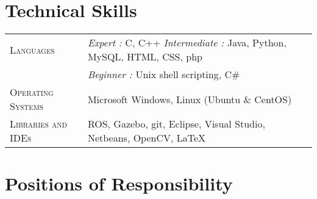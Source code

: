 \documentclass[a4paper,10pt]{extarticle} %
\begin{document}
\section{Technical Skills}

\begin{tabular}{R{3.0cm}|p{15.0cm}}
\textsc{Languages} & {\itshape{Expert : }}C, C++ {\itshape{Intermediate : }}Java, Python, MySQL, HTML, CSS, php\\
& {\itshape{Beginner : }}Unix shell scripting, C\# \\
\textsc{Operating Systems} &  Microsoft Windows, Linux (Ubuntu \& CentOS)\\
\textsc{Libraries and IDEs} & ROS, Gazebo, git, Eclipse, Visual Studio, Netbeans, OpenCV, LaTeX\\
\end{tabular}


\section{Positions of Responsibility}
\end{document}

